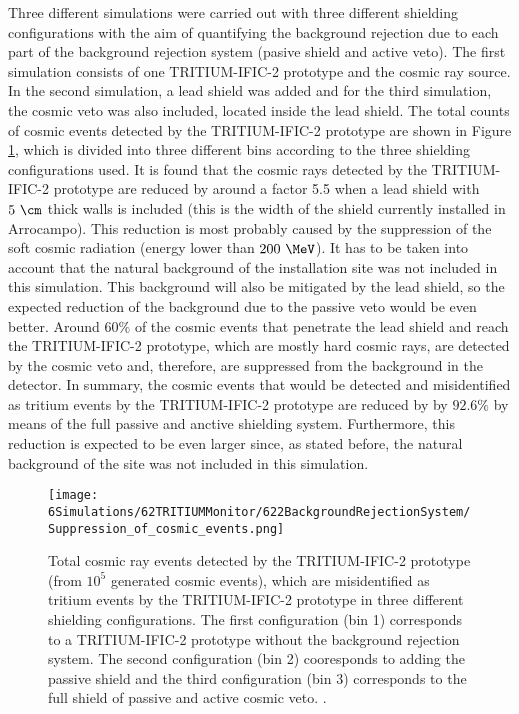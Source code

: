 Three different simulations were carried out with three different shielding configurations with the aim of quantifying the background rejection due to each part of the background rejection system (pasive shield and active veto). The first simulation consists of one TRITIUM-IFIC-2 prototype and the cosmic ray source. In the second simulation, a lead shield was added and for the third simulation, the cosmic veto was also included, located inside the lead shield. The total counts of cosmic events detected by the TRITIUM-IFIC-2 prototype are shown in Figure \ref{fig:CosmicEventsSuppressionSimulated}, which is divided into three different bins according to the three shielding configurations used. It is found that the cosmic rays detected by the TRITIUM-IFIC-2 prototype are reduced by around a factor 5.5 when a lead shield with $5~\cm$ thick walls is included (this is the width of the shield currently installed in Arrocampo). This reduction is most probably caused by the suppression of the soft cosmic radiation (energy lower than $200~\MeV$). It has to be taken into account that the natural background of the installation site was not included in this simulation. This background will also be mitigated by the lead shield, so the expected reduction of the background due to the passive veto would be even better. Around $60\%$ of the cosmic events that penetrate the lead shield and reach the TRITIUM-IFIC-2 prototype, which are mostly hard cosmic rays, are detected by the cosmic veto and, therefore, are suppressed from the background in the detector. In summary, the cosmic events that would be detected and misidentified as tritium events by the TRITIUM-IFIC-2 prototype are reduced by by $92.6\%$ by means of the full passive and anctive shielding system. Furthermore, this reduction is expected to be even larger since, as stated before, the natural background of the site was not included in this simulation.

\begin{figure}[h]
\texttt{[image: 6Simulations/62TRITIUMMonitor/622BackgroundRejectionSystem/Suppression\_of\_cosmic\_events.png]}
\centering
\caption{Total cosmic ray events detected by the TRITIUM-IFIC-2 prototype (from $10^5$ generated cosmic events), which are misidentified as tritium events by the TRITIUM-IFIC-2 prototype in three different shielding configurations. The first configuration (bin 1) corresponds to a TRITIUM-IFIC-2 prototype without the background rejection system. The second configuration (bin 2) cooresponds to adding the passive shield and the third configuration (bin 3) corresponds to the full shield of passive and active cosmic veto.  \label{fig:CosmicEventsSuppressionSimulated}.}
\end{figure}